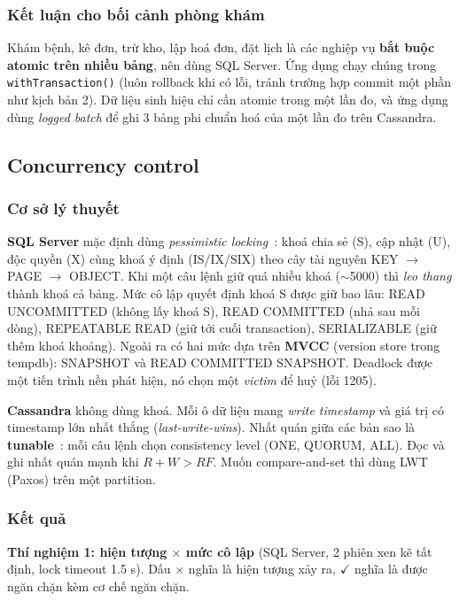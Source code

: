\subsubsection{Kết luận cho bối cảnh phòng khám}
Khám bệnh, kê đơn, trừ kho, lập hoá đơn, đặt lịch là các nghiệp vụ \textbf{bắt buộc atomic trên nhiều bảng}, nên dùng SQL Server. Ứng dụng chạy chúng trong \texttt{withTransaction()} (luôn rollback khi có lỗi, tránh trường hợp commit một phần như kịch bản 2). Dữ liệu sinh hiệu chỉ cần atomic trong một lần đo, và ứng dụng dùng \textit{logged batch} để ghi 3 bảng phi chuẩn hoá của một lần đo trên Cassandra.

\subsection{Concurrency control}
\label{sec:concurrency}

\subsubsection{Cơ sở lý thuyết}
\textbf{SQL Server} mặc định dùng \textit{pessimistic locking}~\cite{mssql-locking}: khoá chia sẻ (S), cập nhật (U), độc quyền (X) cùng khoá ý định (IS/IX/SIX) theo cây tài nguyên KEY $\rightarrow$ PAGE $\rightarrow$ OBJECT. Khi một câu lệnh giữ quá nhiều khoá ($\sim$5000) thì \textit{leo thang} thành khoá cả bảng. Mức cô lập quyết định khoá S được giữ bao lâu: READ UNCOMMITTED (không lấy khoá S), READ COMMITTED (nhả sau mỗi dòng), REPEATABLE READ (giữ tới cuối transaction), SERIALIZABLE (giữ thêm khoá khoảng). Ngoài ra có hai mức dựa trên \textbf{MVCC} (version store trong tempdb): SNAPSHOT và READ COMMITTED SNAPSHOT. Deadlock được một tiến trình nền phát hiện, nó chọn một \textit{victim} để huỷ (lỗi 1205).

\textbf{Cassandra} không dùng khoá. Mỗi ô dữ liệu mang \textit{write timestamp} và giá trị có timestamp lớn nhất thắng (\textit{last-write-wins}). Nhất quán giữa các bản sao là \textbf{tunable}~\cite{cassandra-docs}: mỗi câu lệnh chọn consistency level (ONE, QUORUM, ALL). Đọc và ghi nhất quán mạnh khi $R + W > RF$. Muốn compare-and-set thì dùng LWT (Paxos) trên một partition.

\subsubsection{Kết quả}

\textbf{Thí nghiệm 1: hiện tượng $\times$ mức cô lập} (SQL Server, 2 phiên xen kẽ tất định, lock timeout 1.5 s). Dấu $\times$ nghĩa là hiện tượng xảy ra, $\checkmark$ nghĩa là được ngăn chặn kèm cơ chế ngăn chặn.


